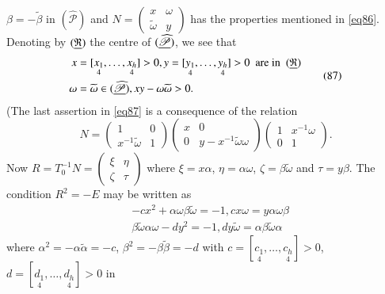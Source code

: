 $\beta=-\widetilde{\beta}$ in $(\widehat{\mathscr{P}})$ and $N=\left(
\begin{smallmatrix}x & \omega\\ \widetilde{\omega} & y
\end{smallmatrix}\right)$ has the properties mentioned in
\eqref{eq86}. Denoting by $(\underline{\mathfrak{R}})$ the centre of
$(\underline{\widehat{\mathscr{P}}})$, we see that
\begin{equation*}
\begin{split}
x &= [\underset{4}{x_{1}},\ldots,\underset{4}{x_{h}}]>0,
y=[\underset{4}{y_{1}},\ldots,\underset{4}{y_{h}}]>0\text{ \ are in
  \ } (\underline{\mathfrak{R}})\\
\omega &= \widetilde{\omega}\in (\underline{\widehat{\mathscr{P}}}), xy
-\omega\widetilde{\omega}>0. 
\end{split}\tag{87}\label{eq87}
\end{equation*}
(The last assertion in \eqref{eq87} is a consequence of the relation 
$$
N=
\begin{pmatrix}
1 & 0\\
x^{-1}\widetilde{\omega} & 1
\end{pmatrix}
\begin{pmatrix}
x & 0\\
0 & y-x^{-1}\widetilde{\omega}\omega
\end{pmatrix}
\begin{pmatrix}
1 & x^{-1}\omega\\
0 & 1
\end{pmatrix}.
$$
Now $R=T^{-1}_{0}N=\left(\begin{smallmatrix} \xi & \eta\\ \zeta & \tau
\end{smallmatrix}\right)$ where $\xi=x\alpha$, $\eta=\alpha \omega$,
$\zeta=\beta\widetilde{\omega}$ and $\tau=y\beta$. The condition
$R^{2}=-E$ may be written as
\begin{equation*}
\begin{split}
& -cx^{2}+\alpha\omega\beta\widetilde{\omega}=-1,
  cx\omega=y\alpha\omega\beta\\
& \beta\widetilde{\omega}\alpha\omega-dy^{2}=-1, dy\widetilde{\omega}=\alpha\beta\widetilde{\omega}\alpha
\end{split}\tag{88}\label{eq88}
\end{equation*}
where $\alpha^{2}=-\alpha\widetilde{\alpha} = -c$,
$\beta^{2}=-\beta\widetilde{\beta}=-d$ with
$c=[\underset{4}{c_{1}},\ldots,\underset{4}{c_{h}}]>0$,
$d=[\underset{4}{d_{1}},\ldots,\underset{4}{d_{h}}]>0$ in
